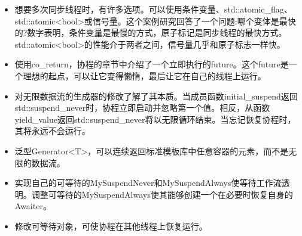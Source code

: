 \begin{tcolorbox}[breakable,enhanced jigsaw,colback=mygreen!5!white,colframe=mygreen!75!black,title={总结}]
	
\begin{itemize}
\item 
想要多次同步线程时，有许多选项。可以使用条件变量、std::atomic\_flag、std::atomic<bool>或信号量。这个案例研究回答了一个问题:哪个变体是最快的?数字表明，条件变量是最慢的方式，原子标记是同步线程的最快方式。std::atomic<bool>的性能介于两者之间，信号量几乎和原子标志一样快。

\item 
使用co\_return，协程的章节中介绍了一个立即执行的future。这个future是一个理想的起点，可以让它变得懒惰，最后让它在自己的线程上运行。

\item 
对无限数据流的生成器的修改了解了其本质。当成员函数initial\_suspend返回std::suspend\_never时，协程立即启动并忽略第一个值。相反，从函数yield\_value返回std::suspend\_never将以无限循环结束。当忘记恢复协程时，其将永远不会运行。

\item 
泛型Generator<T>，可以连续返回标准模板库中任意容器的元素，而不是无限的数据流。

\item 
实现自己的可等待的MySuspendNever和MySuspendAlways使等待工作流透明。调整可等待的MySuspendAlways使其能够创建一个在必要时恢复自身的Awaiter。

\item 
修改可等待对象，可使协程在其他线程上恢复运行。
\end{itemize}
	
\end{tcolorbox}




















